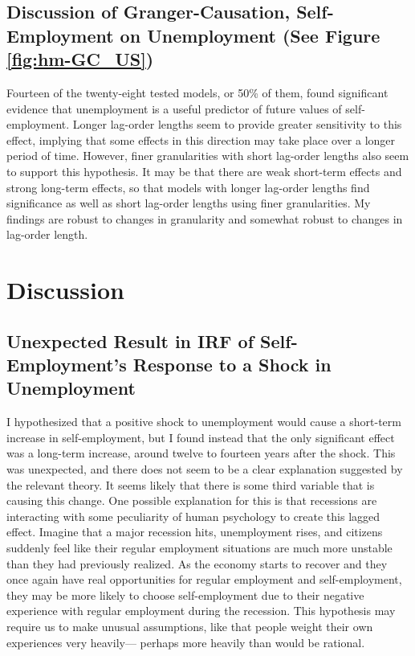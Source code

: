 \documentclass[]{ecca}
\begin{document}
\subsection{Discussion of Granger-Causation, Self-Employment on Unemployment (See Figure \ref{fig:hm-GC_US})}
Fourteen of the twenty-eight tested models, or 50\% of them, found significant evidence that unemployment is a useful predictor of future values of self-employment. Longer lag-order lengths seem to provide greater sensitivity to this effect, implying that some effects in this direction may take place over a longer period of time. However, finer granularities with short lag-order lengths also seem to support this hypothesis. It may be that there are weak short-term effects and strong long-term effects, so that models with longer lag-order lengths find significance as well as short lag-order lengths using finer granularities. My findings are robust to changes in granularity and somewhat robust to changes in lag-order length.




\section{Discussion}

\subsection{Unexpected Result in IRF of Self-Employment's Response to a Shock in Unemployment}

I hypothesized that a positive shock to unemployment would cause a short-term increase in self-employment, but I found instead that the only significant effect was a long-term increase, around twelve to fourteen years after the shock. This was unexpected, and there does not seem to be a clear explanation suggested by the relevant theory. It seems likely that there is some third variable that is causing this change. One possible explanation for this is that recessions are interacting with some peculiarity of human psychology to create this lagged effect. Imagine that a major recession hits, unemployment rises, and citizens suddenly feel like their regular employment situations are much more unstable than they had previously realized. As the economy starts to recover and they once again have real opportunities for regular employment and self-employment, they may be more likely to choose self-employment due to their negative experience with regular employment during the recession. This hypothesis may require us to make unusual assumptions, like that people weight their own experiences very heavily--- perhaps more heavily than would be rational. 
\end{document}
